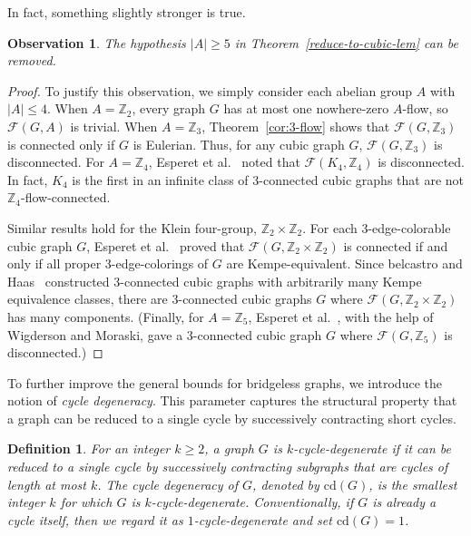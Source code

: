 \documentclass[a4paper,12pt]{article}
\theoremstyle{plain}
\newtheorem{obs}[theorem]{Observation}
\newtheorem{definition}[theorem]{Definition}
\theoremstyle{definition}
\newcommand{\Z}{\mathbb{Z}}
\renewcommand\le\leqslant
\renewcommand\ge\geqslant
\begin{document}
In fact, something slightly stronger is true.
\begin{obs}
The hypothesis $|A|\ge 5$ in Theorem~\ref{reduce-to-cubic-lem} can be removed.
\end{obs}
\begin{proof} 
To justify this observation, we simply consider each abelian group $A$ with $|A|\le 4$. When $A = \mathbb{Z}_2$, every graph $G$ has at most one nowhere-zero $A$-flow, so $\mathcal{F}(G,A)$ is trivial. When $A = \mathbb{Z}_3$, Theorem~\ref{cor:3-flow} shows that $\mathcal{F}(G,\mathbb{Z}_3)$ is connected only if $G$ is Eulerian. Thus, for any cubic graph $G$, $\mathcal{F}(G,\mathbb{Z}_3)$ is disconnected. For $A = \mathbb{Z}_4$, Esperet et al.~\cite[Section~2.4]{esperet-et-al} noted that $\mathcal{F}(K_4,\mathbb{Z}_4)$ is disconnected. In fact, $K_4$ is the first in an infinite class of 3-connected cubic graphs that are not $\mathbb{Z}_4$-flow-connected.

Similar results hold for the Klein four-group, $\Z_2\times\Z_2$. 
For each 3-edge-colorable cubic graph $G$, Esperet et al.~\cite[Theorem~4.3]{esperet-et-al} proved that $\mathcal{F}(G,\mathbb{Z}_2\times\mathbb{Z}_2)$ is connected if and only if all proper 3-edge-colorings of $G$ are Kempe-equivalent. Since belcastro and Haas~\cite[Theorem~4.10]{bH} constructed 3-connected cubic graphs with arbitrarily many Kempe equivalence classes, there are 3-connected cubic graphs $G$ where $\mathcal{F}(G,\mathbb{Z}_2\times\mathbb{Z}_2)$ has many components. (Finally, for $A=\Z_5$, Esperet et al.~\cite{esperet-et-al}, with the help of Wigderson and Moraski, gave a 3-connected cubic graph $G$ where $\mathcal{F}(G,\mathbb{Z}_5)$ is disconnected.)
\end{proof}

To further improve the general bounds for bridgeless graphs, we introduce the notion of \emph{cycle degeneracy}. This parameter captures the structural property that a graph can be 
reduced to a single cycle by successively contracting short cycles.

\begin{definition}
For an integer $k \ge 2$, a graph $G$ is \emph{$k$-cycle-degenerate} if it can be reduced to a single cycle by successively contracting subgraphs that are cycles of length at most $k$. The \emph{cycle degeneracy} of $G$, denoted by $\mathrm{cd}(G)$, is the smallest integer $k$ for which $G$ is $k$-cycle-degenerate. Conventionally, if $G$ is already a cycle itself, then we regard it as $1$-cycle-degenerate and set $\mathrm{cd}(G)=1$.
\end{definition}
\end{document}

